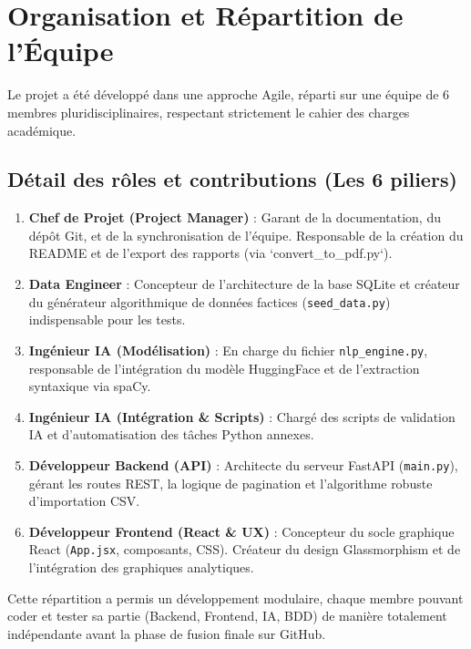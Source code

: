 \documentclass[12pt,a4paper]{article}
\begin{document}
\section{Organisation et Répartition de l'Équipe}
Le projet a été développé dans une approche Agile, réparti sur une équipe de 6 membres pluridisciplinaires, respectant strictement le cahier des charges académique.

\subsection{Détail des rôles et contributions (Les 6 piliers)}
\begin{enumerate}
    \item \textbf{Chef de Projet (Project Manager)} : Garant de la documentation, du dépôt Git, et de la synchronisation de l'équipe. Responsable de la création du README et de l'export des rapports (via `convert\_to\_pdf.py`).
    \item \textbf{Data Engineer} : Concepteur de l'architecture de la base SQLite et créateur du générateur algorithmique de données factices (\texttt{seed\_data.py}) indispensable pour les tests.
    \item \textbf{Ingénieur IA (Modélisation)} : En charge du fichier \texttt{nlp\_engine.py}, responsable de l'intégration du modèle HuggingFace et de l'extraction syntaxique via spaCy.
    \item \textbf{Ingénieur IA (Intégration \& Scripts)} : Chargé des scripts de validation IA et d'automatisation des tâches Python annexes.
    \item \textbf{Développeur Backend (API)} : Architecte du serveur FastAPI (\texttt{main.py}), gérant les routes REST, la logique de pagination et l'algorithme robuste d'importation CSV.
    \item \textbf{Développeur Frontend (React \& UX)} : Concepteur du socle graphique React (\texttt{App.jsx}, composants, CSS). Créateur du design Glassmorphism et de l'intégration des graphiques analytiques.
\end{enumerate}

Cette répartition a permis un développement modulaire, chaque membre pouvant coder et tester sa partie (Backend, Frontend, IA, BDD) de manière totalement indépendante avant la phase de fusion finale sur GitHub.
\newpage

\end{document}
